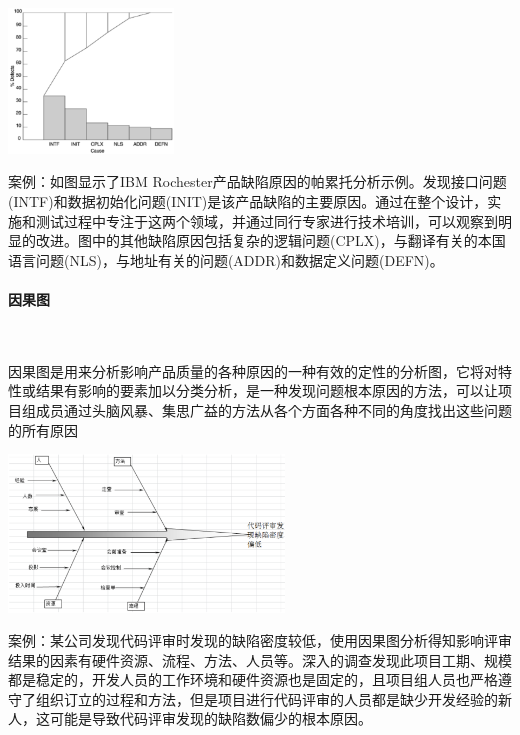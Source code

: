 \begin{table}
    \centering
    \vspace{-1.7em}
    \includegraphics[width=0.33\textwidth]{images/帕累托图示例.png}
    \vspace{-4em}
\end{table}
案例：如图显示了IBM Rochester产品缺陷原因的帕累托分析示例。发现接口问题(INTF)和数据初始化问题(INIT)是该产品缺陷的主要原因。通过在整个设计，实施和测试过程中专注于这两个领域，并通过同行专家进行技术培训，可以观察到明显的改进。图中的其他缺陷原因包括复杂的逻辑问题(CPLX)，与翻译有关的本国语言问题(NLS)，与地址有关的问题(ADDR)和数据定义问题(DEFN)。

\paragraph{因果图}~{} \par
因果图是用来分析影响产品质量的各种原因的一种有效的定性的分析图，它将对特性或结果有影响的要素加以分类分析，是一种发现问题根本原因的方法，可以让项目组成员通过头脑风暴、集思广益的方法从各个方面各种不同的角度找出这些问题的所有原因

\begin{table}
    \centering
    \vspace{-1.5em}
    \includegraphics[width=0.55\textwidth]{images/因果图示例.png}
    \vspace{-4em}
\end{table}
案例：某公司发现代码评审时发现的缺陷密度较低，使用因果图分析得知影响评审结果的因素有硬件资源、流程、方法、人员等。深入的调查发现此项目工期、规模都是稳定的，开发人员的工作环境和硬件资源也是固定的，且项目组人员也严格遵守了组织订立的过程和方法，但是项目进行代码评审的人员都是缺少开发经验的新人，这可能是导致代码评审发现的缺陷数偏少的根本原因。

